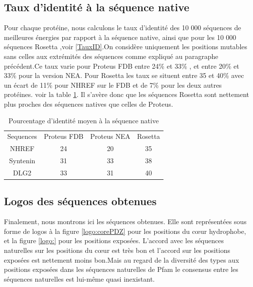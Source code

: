   
\subsection{Taux d'identité à la séquence native}  
  
Pour chaque protéine, nous calculons le taux d'identité des 10 000 séquences de meilleures énergies par rapport à la séquence native, ainsi que pour les 10 000 séquences Rosetta ,voir \ref{TauxID}.On considère uniquement les positions mutables sans celles aux extrémités des séquences comme expliqué au paragraphe précédent.Ce taux varie pour Proteus FDB entre 24\% et 33\% , et entre 20\% et 33\% pour la version NEA. Pour Rosetta les taux se situent entre 35 et 40\% avec un écart de 11\% pour NHREF sur le FDB et de 7\% pour les deux autres protéines. voir la table \ref{tab:IdentNEA}. Il s'avère donc que les séquences Rosetta sont nettement plus proches des séquences natives que celles de Proteus.  

\begin{table}[!htbp]
      \centering

      \begin{tabular}{cccc}

        \toprule
        Sequences & Proteus FDB & Proteus NEA & Rosetta \\
        \cmidrule{1-4}
        NHREF     & 24 & 20 & 35 \\
        Syntenin  & 31 & 33 & 38 \\
        DLG2      & 33 & 31 & 40 \\
        \bottomrule

      \end{tabular}      
      \caption{Pourcentage d'identité moyen à la séquence native}
\label{tab:IdentNEA}      
    \end{table}

\subsection{Logos des séquences obtenues}

Finalement, nous montrons ici les séquences obtenues. Elle sont représentées sous forme de logos à la figure \ref{logo:corePDZ} pour les positions du cœur hydrophobe, et la figure \ref{logo:} pour les positions exposées. L'accord avec les séquences naturelles sur les positions du cœur est très bon et l'accord sur les positions exposées est nettement moins bon.Mais au regard de la diversité des types aux positions exposées dans les séquences naturelles de Pfam le consensus entre les séquences naturelles est lui-même quasi inexistant.

